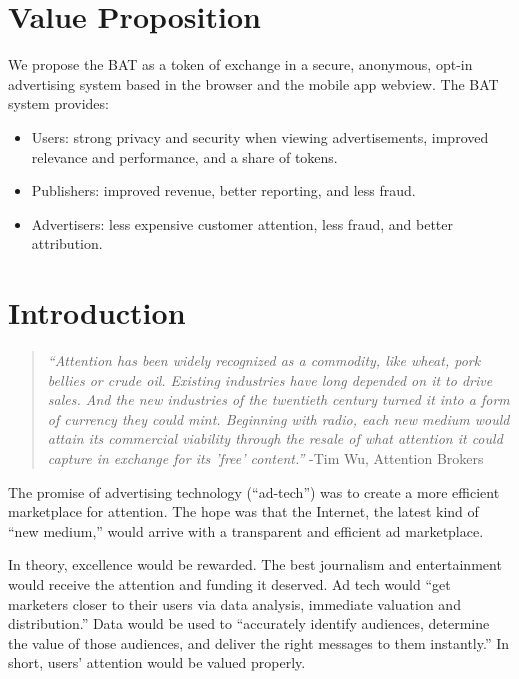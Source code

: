 \documentclass[11pt]{article}
\begin{document}
\tableofcontents
\pagebreak

\section{Value Proposition}
\label{sec-2}

We propose the \textrm{BAT} as a token of exchange in a secure, anonymous, opt-in advertising system based in the browser and the mobile app webview. The \textrm{BAT} system provides: 
\begin{itemize}
\item{Users: strong privacy and security when viewing advertisements, improved relevance and performance, and a share of tokens. }
\item{Publishers: improved  revenue, better reporting, and less fraud. }
\item{Advertisers: less expensive customer attention, less fraud, and better attribution.}
\end{itemize}
\section{Introduction}
\label{sec-3}

\begin{quote}\textit{``Attention has been widely recognized as a commodity, like wheat, pork bellies or crude oil. Existing industries have long depended on it to drive sales. And the new industries of the twentieth century turned it into a form of currency they could mint. Beginning with radio, each new medium would attain its commercial viability through the resale of what attention it could capture in exchange for its 'free' content.''} -Tim Wu, Attention Brokers \end{quote} 

The promise of advertising technology (``ad-tech'') was to create a more efficient marketplace for attention. The hope was that the Internet, the latest kind of ``new medium,'' would arrive with a transparent and efficient ad marketplace. 

In theory, excellence would be rewarded. The best journalism and entertainment would receive the attention and funding it deserved. Ad tech would ``get marketers closer to their users via data analysis, immediate valuation and distribution.'' Data would be used to ``accurately identify audiences, determine the value of those audiences, and deliver the right messages to them instantly.''\cite{1} In short, users' attention would be valued properly. 
\end{document}
